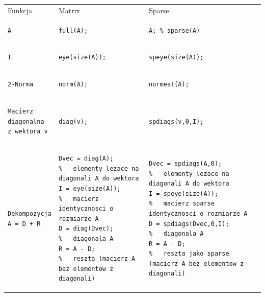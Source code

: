 \documentclass[a4paper,margin=1.54cm]{article}
\begin{document}
\begin{table}[!ht]
{%
\begin{tabular}
{p{}p{}p{}}
Funkcja  &  Matrix & Sparse \\
\begin{lstlisting}
A
\end{lstlisting}&
\begin{lstlisting}
full(A);
\end{lstlisting}&
\begin{lstlisting}
A; % sparse(A)
\end{lstlisting}\\

\begin{lstlisting}
I
\end{lstlisting}&
\begin{lstlisting}
eye(size(A));
\end{lstlisting}&
\begin{lstlisting}
speye(size(A));
\end{lstlisting}\\

\begin{lstlisting}
2-Norma
\end{lstlisting}&
\begin{lstlisting}
norm(A);
\end{lstlisting}&
\begin{lstlisting}
normest(A);
\end{lstlisting}\\

\begin{lstlisting}
Macierz 
diagonalna 
z wektora v
\end{lstlisting}&
\begin{lstlisting}
diag(v);
\end{lstlisting}&
\begin{lstlisting}
spdiags(v,0,I);
\end{lstlisting}\\

\begin{lstlisting}
Dekompozycja
A = D + R
\end{lstlisting}&
\begin{lstlisting}
Dvec = diag(A); 
%   elementy lezace na diagonali A do wektora
I = eye(size(A)); 
%   macierz identycznosci o rozmiarze A
D = diag(Dvec); 
%   diagonala A
R = A - D; 
%   reszta (macierz A bez elementow z diagonali)
\end{lstlisting}&
\begin{lstlisting}
Dvec = spdiags(A,0); 
%   elementy lezace na diagonali A do wektora
I = speye(size(A)); 
%   macierz sparse identycznosci o rozmiarze A
D = spdiags(Dvec,0,I); 
%   diagonala A
R = A - D; 
%   reszta jako sparse (macierz A bez elementow z diagonali)
\end{lstlisting}\\
\end{tabular}%
}
\label{tab:sparse}
\end{table}
\end{document}
